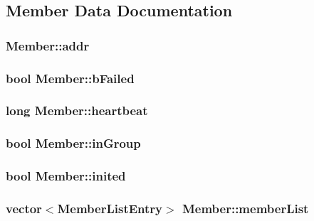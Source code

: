 \subsection{\-Member \-Data \-Documentation}
\hypertarget{class_member_a15255ad694aab6b42313f01d9f1c2b03}{
\subsubsection[{addr}]{ {\bf \-Member\-::addr}}}\label{df/dbc/class_member_a15255ad694aab6b42313f01d9f1c2b03}
\hypertarget{class_member_adf9e67156c652455a281dfaeed31e4b3}{
\subsubsection[{b\-Failed}]{\setlength{\rightskip}{0pt plus 5cm}bool {\bf \-Member\-::b\-Failed}}}\label{df/dbc/class_member_adf9e67156c652455a281dfaeed31e4b3}
\hypertarget{class_member_a112370796bf495cafda11827a21682a4}{
\subsubsection[{heartbeat}]{\setlength{\rightskip}{0pt plus 5cm}long {\bf \-Member\-::heartbeat}}}\label{df/dbc/class_member_a112370796bf495cafda11827a21682a4}
\hypertarget{class_member_aaa10136152397774c018ad7775369e55}{
\subsubsection[{in\-Group}]{\setlength{\rightskip}{0pt plus 5cm}bool {\bf \-Member\-::in\-Group}}}\label{df/dbc/class_member_aaa10136152397774c018ad7775369e55}
\hypertarget{class_member_a1c7380a6632aecda712316ca24f3f015}{
\subsubsection[{inited}]{\setlength{\rightskip}{0pt plus 5cm}bool {\bf \-Member\-::inited}}}\label{df/dbc/class_member_a1c7380a6632aecda712316ca24f3f015}
\hypertarget{class_member_a7c3872c420af12628ce50bbc66010842}{
\subsubsection[{member\-List}]{\setlength{\rightskip}{0pt plus 5cm}vector$<${\bf \-Member\-List\-Entry}$>$ {\bf \-Member\-::member\-List}}}\label{df/dbc/class_member_a7c3872c420af12628ce50bbc66010842}
